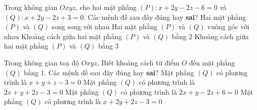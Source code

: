 \begin{ex}%
	Trong không gian $Oxyz$, cho hai mặt phẳng $(P)\colon x+2y-2z-6=0$ và $(Q)\colon x+2y-2z+3=0$. Các mệnh đề sau đây đúng hay \textbf{sai}?
\choiceTF
{\True Hai mặt phẳng $(P)$ và $(Q)$ song song với nhau}
{Hai mặt phẳng $(P)$ và $(Q)$ vuông góc với nhau}
{Khoảng cách giữa hai mặt phẳng $(P)$ và $(Q)$ bằng $2$}
{\True Khoảng cách giữa hai mặt phẳng $(P)$ và $(Q)$ bằng $3$}
\end{ex}

\begin{ex}%
	Trong không gian toạ độ $Oxyz$, Biết khoảng cách từ điểm $O$ đến mặt phẳng $(Q)$ bằng 1. Các mệnh đề sau đây đúng hay \textbf{sai}?
\choiceTF
{Mặt phẳng $(Q)$ có phương trình là $x + y + z-3 = 0$}
{\True Mặt phẳng $(Q)$ có phương trình là $2x + y + 2z-3 = 0$}
{Mặt phẳng $(Q)$ có phương trình là $2x + y- 2z + 6 = 0$}
{\True Mặt phẳng $(Q)$ có phương trình là $x + 2y + 2z-3= 0$}
\end{ex}

